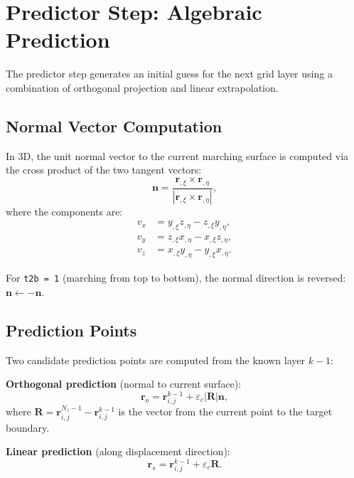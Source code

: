 \documentclass[11pt,a4paper]{report}
\newcommand{\rvec}{\bm{r}}
\newcommand{\nvec}{\bm{n}}
\begin{document}
\section{Predictor Step: Algebraic Prediction}

The predictor step generates an initial guess for the next grid layer using a combination of orthogonal projection and linear extrapolation.

\subsection{Normal Vector Computation}

In 3D, the unit normal vector to the current marching surface is computed via the cross product of the two tangent vectors:
\begin{equation}
    \nvec = \frac{\rvec_{,\xi} \times \rvec_{,\eta}}{|\rvec_{,\xi} \times \rvec_{,\eta}|},
\end{equation}
where the components are:
\begin{equation}
\begin{aligned}
    v_x &= y_{,\xi} z_{,\eta} - z_{,\xi} y_{,\eta}, \\
    v_y &= z_{,\xi} x_{,\eta} - x_{,\xi} z_{,\eta}, \\
    v_z &= x_{,\xi} y_{,\eta} - y_{,\xi} x_{,\eta}.
\end{aligned}
\end{equation}

For \texttt{t2b = 1} (marching from top to bottom), the normal direction is reversed: $\nvec \leftarrow -\nvec$.

\subsection{Prediction Points}

Two candidate prediction points are computed from the known layer $k-1$:

\textbf{Orthogonal prediction} (normal to current surface):
\begin{equation}
    \rvec_o = \rvec_{i,j}^{k-1} + \varepsilon_c |\bm{R}| \nvec,
\end{equation}
where $\bm{R} = \rvec_{i,j}^{N_z-1} - \rvec_{i,j}^{k-1}$ is the vector from the current point to the target boundary.

\textbf{Linear prediction} (along displacement direction):
\begin{equation}
    \rvec_s = \rvec_{i,j}^{k-1} + \varepsilon_c \bm{R}.
\end{equation}
\end{document}
